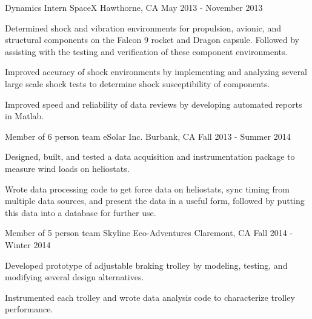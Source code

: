 \begin{cventries}
  \cventry
    {Dynamics Intern} %
    {SpaceX} %
    {Hawthorne, CA} %
    {May 2013 - November 2013} %
    {
      \begin{cvitems} %
        \item {Determined shock and vibration environments for propulsion, avionic, and structural components on the Falcon 9 rocket and Dragon capsule. Followed by assisting with the testing and verification of these component environments.}
        \item {Improved accuracy of shock environments by implementing and analyzing several large scale shock tests to determine shock susceptibility of components.}
        \item {Improved speed and reliability of data reviews by developing automated reports in Matlab.}
      \end{cvitems} 
    }

  \cventry
    {Member of 6 person team} %
    {eSolar Inc.} %
    {Burbank, CA} %
    {Fall 2013 - Summer 2014} %
    {
      \begin{cvitems} %
        \item {Designed, built, and tested a data acquisition and instrumentation package to measure wind loads on heliostats.}
        \item {Wrote data processing code to get force data on heliostats, sync timing from multiple data sources, and present the data in a useful form, followed by putting this data into a database for further use.}
      \end{cvitems}
    }

  \cventry
    {Member of 5 person team} %
    {Skyline Eco-Adventures} %
    {Claremont, CA} %
    {Fall 2014 - Winter 2014} %
    {
      \begin{cvitems} %
        \item {Developed prototype of adjustable braking trolley by modeling, testing, and modifying several design alternatives.}
        \item {Instrumented each trolley and wrote data analysis code to characterize trolley performance.}
      \end{cvitems}
    }


\end{cventries}
